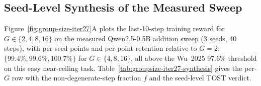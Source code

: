 \subsection{Seed-Level Synthesis of the Measured Sweep}
\label{sec:group-size-iter27}

Figure~\ref{fig:group-size-iter27}A plots the last-10-step training reward for
$G\in\{2,4,8,16\}$ on the measured Qwen2.5-0.5B addition sweep (3 seeds, 40 steps),
with per-seed points and per-point retention relative to $G{=}2$:
$\{99.4\%, 99.6\%, 100.7\%\}$ for $G\in\{4,8,16\}$, all above the Wu~2025 97.6\%
threshold on this easy near-ceiling task. Table~\ref{tab:groupsize-iter27-synthesis}
gives the per-$G$ row with the non-degenerate-step fraction $f$ and the seed-level
TOST verdict.

